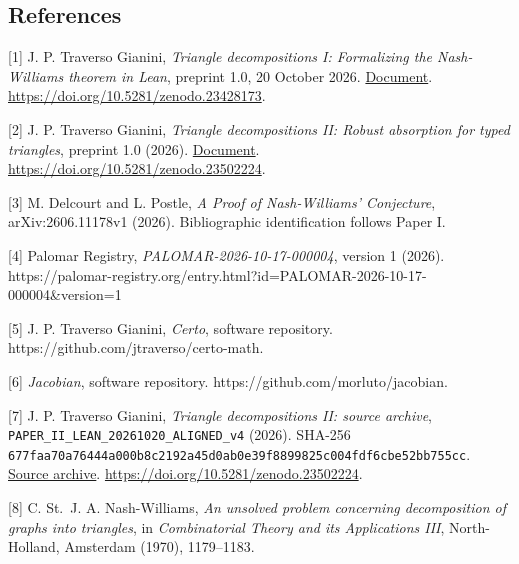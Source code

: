 \documentclass[english,11pt,a4paper]{article}
\begin{document}
\noindent\begin{minipage}{\linewidth}
\subsection{References}\label{references}

\begingroup\small\raggedright
\setlength{\parskip}{3pt}

{[}1{]} J. P. Traverso Gianini, \emph{Triangle decompositions I: Formalizing the Nash-Williams theorem in Lean}, preprint 1.0, 20 October 2026. \href{https://github.com/jtraverso/nash-williams-triangle-decompositions-release/blob/main/preprints/PAPER_I/01_manuscript/PAPER_I_preprint_v1.0_en.md}{Document}. \url{https://doi.org/10.5281/zenodo.23428173}.

{[}2{]} J. P. Traverso Gianini, \emph{Triangle decompositions II: Robust absorption for typed triangles}, preprint 1.0 (2026). \href{https://github.com/jtraverso/nash-williams-triangle-decompositions-release/blob/main/preprints/PAPER_II/01_manuscript/PAPER_II_preprint_v1.0_en.md}{Document}. \url{https://doi.org/10.5281/zenodo.23502224}.

{[}3{]} M. Delcourt and L. Postle, \emph{A Proof of Nash-Williams' Conjecture}, arXiv:2606.11178v1 (2026). Bibliographic identification follows Paper I.

{[}4{]} Palomar Registry, \emph{PALOMAR-2026-10-17-000004}, version 1 (2026). https://palomar-registry.org/entry.html?id=PALOMAR-2026-10-17-000004\&version=1

{[}5{]} J. P. Traverso Gianini, \emph{Certo}, software repository. https://github.com/jtraverso/certo-math.

{[}6{]} \emph{Jacobian}, software repository. https://github.com/morluto/jacobian.

{[}7{]} J. P. Traverso Gianini, \emph{Triangle decompositions II: source archive}, \texttt{PAPER\_\allowbreak{}II\_\allowbreak{}LEAN\_\allowbreak{}20261020\_\allowbreak{}ALIGNED\_\allowbreak{}v4} (2026). SHA-256 \texttt{677faa70\allowbreak{}a76444a0\allowbreak{}00b8c219\allowbreak{}2a45d0ab\allowbreak{}0e39f889\allowbreak{}9825c004\allowbreak{}fdf6cbe5\allowbreak{}2bb755cc}. \href{https://github.com/jtraverso/nash-williams-triangle-decompositions-release/blob/d6d020982ebf3f3cd8c104b6befc6c094850b3e7/archives/PAPER_II_LEAN_20261020_ALIGNED_v4.zip}{Source archive}. \url{https://doi.org/10.5281/zenodo.23502224}.

{[}8{]} C. St.~J. A. Nash-Williams, \emph{An unsolved problem concerning decomposition of graphs into triangles}, in \emph{Combinatorial Theory and its Applications III}, North-Holland, Amsterdam (1970), 1179--1183.


\end{minipage}
\end{document}
